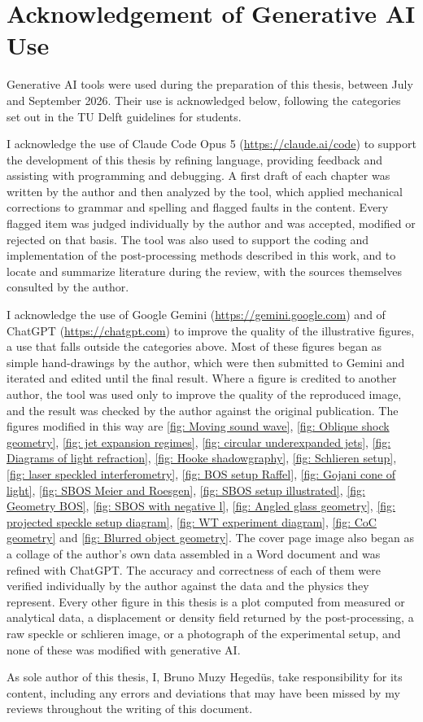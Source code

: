 \chapter{Acknowledgement of Generative AI Use}
\label{Appendix: AI Acknowledgement}

Generative AI tools were used during the preparation of this thesis, between July and September 2026. Their use is acknowledged below, following the categories set out in the TU Delft guidelines for students.

I acknowledge the use of Claude Code Opus 5 (\url{https://claude.ai/code}) to support the development of this thesis by refining language, providing feedback and assisting with programming and debugging. A first draft of each chapter was written by the author and then analyzed by the tool, which applied mechanical corrections to grammar and spelling and flagged faults in the content. Every flagged item was judged individually by the author and was accepted, modified or rejected on that basis. The tool was also used to support the coding and implementation of the post-processing methods described in this work, and to locate and summarize literature during the review, with the sources themselves consulted by the author.

I acknowledge the use of Google Gemini (\url{https://gemini.google.com}) and of ChatGPT (\url{https://chatgpt.com}) to improve the quality of the illustrative figures, a use that falls outside the categories above. Most of these figures began as simple hand-drawings by the author, which were then submitted to Gemini and iterated and edited until the final result. Where a figure is credited to another author, the tool was used only to improve the quality of the reproduced image, and the result was checked by the author against the original publication. The figures modified in this way are \ref{fig: Moving sound wave}, \ref{fig: Oblique shock geometry}, \ref{fig: jet expansion regimes}, \ref{fig: circular underexpanded jets}, \ref{fig: Diagrams of light refraction}, \ref{fig: Hooke shadowgraphy}, \ref{fig: Schlieren setup}, \ref{fig: laser speckled interferometry}, \ref{fig: BOS setup Raffel}, \ref{fig: Gojani cone of light}, \ref{fig: SBOS Meier and Roesgen}, \ref{fig: SBOS setup illustrated}, \ref{fig: Geometry BOS}, \ref{fig: SBOS with negative l}, \ref{fig: Angled glass geometry}, \ref{fig: projected speckle setup diagram}, \ref{fig: WT experiment diagram}, \ref{fig: CoC geometry} and \ref{fig: Blurred object geometry}. The cover page image also began as a collage of the author's own data assembled in a Word document and was refined with ChatGPT. The accuracy and correctness of each of them were verified individually by the author against the data and the physics they represent. Every other figure in this thesis is a plot computed from measured or analytical data, a displacement or density field returned by the post-processing, a raw speckle or schlieren image, or a photograph of the experimental setup, and none of these was modified with generative AI.

As sole author of this thesis, I, Bruno Muzy Hegedüs, take responsibility for its content, including any errors and deviations that may have been missed by my reviews throughout the writing of this document.
